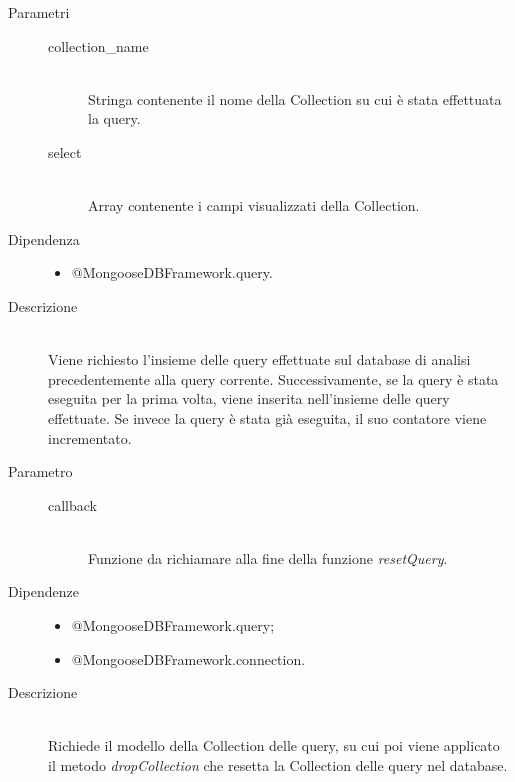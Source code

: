 \begin{description}
\begin{mldescription}
    \begin{description}
	 \item[Parametri] \hfill
	  \begin{description}
	   \item[collection\_name] \hfill \\
	   Stringa contenente il nome della Collection su cui è stata effettuata la query.
	   \item[select] \hfill \\
	   Array contenente i campi visualizzati della Collection.
	  \end{description}
	 \item[Dipendenza] \hfill
	  \begin{itemize}
	   \item @MongooseDBFramework.query.
	  \end{itemize}
	 \item[Descrizione] \hfill \\
	 Viene richiesto l'insieme delle query effettuate sul database di analisi precedentemente alla query corrente. Successivamente, se la query è stata eseguita per la prima volta, viene inserita nell'insieme delle query effettuate. Se invece la query è stata già eseguita, il suo contatore viene incrementato.
	\end{description}	    
    
    \begin{description}
	 \item[Parametro] \hfill
	  \begin{description}
	   \item[callback] \hfill \\
	   Funzione da richiamare alla fine della funzione \textit{resetQuery}.
	  \end{description}
	 \item[Dipendenze] \hfill
	  \begin{itemize}
	   \item @MongooseDBFramework.query;
	   \item @MongooseDBFramework.connection.
	  \end{itemize}
	 \item[Descrizione] \hfill \\
	 Richiede il modello della Collection delle query, su cui poi viene applicato il metodo \textit{dropCollection} che resetta la Collection delle query nel database.
	\end{description}	    
    

\end{mldescription}
\end{description}
